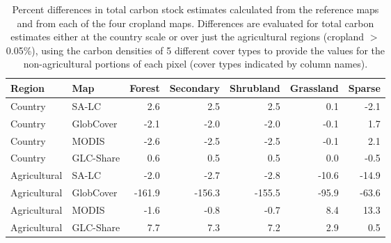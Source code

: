 \begin{table}[ht]
\centering
\caption{Percent differences in total carbon stock estimates calculated from the reference maps and from each of the four cropland maps. Differences are evaluated for total carbon estimates either at the country scale or over just the agricultural regions (cropland $>$0.05\%), using the carbon densities of 5 different cover types to provide the values for the non-agricultural portions of each pixel (cover types indicated by column names).} 
\begin{tabular}{llrrrrr}
  \hline
Region & Map & Forest & Secondary & Shrubland & Grassland & Sparse \\ 
  \hline
Country & SA-LC & 2.6 & 2.5 & 2.5 & 0.1 & -2.1 \\ 
  Country & GlobCover & -2.1 & -2.0 & -2.0 & -0.1 & 1.7 \\ 
  Country & MODIS & -2.6 & -2.5 & -2.5 & -0.1 & 2.1 \\ 
  Country & GLC-Share & 0.6 & 0.5 & 0.5 & 0.0 & -0.5 \\ 
  Agricultural & SA-LC & -2.0 & -2.7 & -2.8 & -10.6 & -14.9 \\ 
  Agricultural & GlobCover & -161.9 & -156.3 & -155.5 & -95.9 & -63.6 \\ 
  Agricultural & MODIS & -1.6 & -0.8 & -0.7 & 8.4 & 13.3 \\ 
  Agricultural & GLC-Share & 7.7 & 7.3 & 7.2 & 2.9 & 0.5 \\ 
   \hline
\end{tabular}
\end{table}
